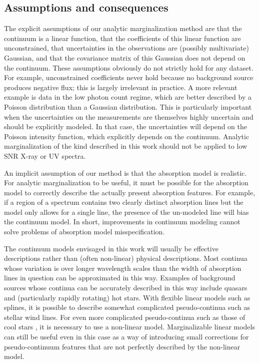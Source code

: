 \documentclass[manuscript]{aastex62}
\begin{document}
\subsection{Assumptions and consequences}
The explicit assumptions of our analytic marginalization method are that the continuum is a linear function, that the coefficients of this linear function are unconstrained, that uncertainties in the observations are (possibly multivariate) Gaussian, and that the covariance matrix of this Gaussian does not depend on the continuum.
These assumptions obviously do not strictly hold for any dataset.
For example, unconstrained coefficients never hold because no background source produces negative flux; this is largely irrelevant in practice.
A more relevant example is data in the low photon count regime, which are better described by a Poisson distribution than a Gaussian distribution.
This is particularly important when the uncertainties on the measurements are themselves highly uncertain and should be explicitly modeled.
In that case, the uncertainties will depend on the Poisson intensity function, which explicitly depends on the continuum.
Analytic marginalization of the kind described in this work should not be applied to low SNR X-ray or UV spectra.

An implicit assumption of our method is that the absorption model is realistic.
For analytic marginalization to be useful, it must be possible for the absorption model to correctly describe the actually present absorption features.
For example, if a region of a spectrum contains two clearly distinct absorption lines but the model only allows for a single line, the presence of the un-modeled line will bias the continuum model.
In short, improvements in continuum modeling cannot solve problems of absorption model misspecification.

The continuum models envisaged in this work will usually be effective descriptions rather than (often non-linear) physical descriptions.
Most continua whose variation is over longer wavelength scales than the width of absorption lines in question can be approximated in this way.
Examples of background sources whose continua can be accurately described in this way include quasars and (particularly rapidly rotating) hot stars.
With flexible linear models such as splines, it is possible to describe somewhat complicated pseudo-continua such as stellar wind lines.
For even more complicated pseudo-continua such as those of cool stars \citep[e.g.]{Zasowski:2015hi}, it is necessary to use a non-linear model.
Marginalizable linear models can still be useful even in this case as a way of introducing small corrections for pseudo-continuum features that are not perfectly described by the non-linear model.
\end{document}
